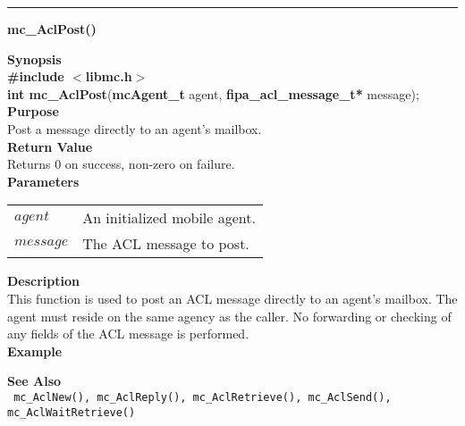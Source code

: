 \noindent
\vspace{5pt}
\rule{6.5in}{0.015in}
\noindent
{}
{\LARGE \bf mc\_AclPost()}\\
\label{api:mc_AclPost()}

\noindent
{\bf Synopsis}\\
{\bf \#include $<$libmc.h$>$}\\
{\bf int mc\_AclPost}({\bf mcAgent\_t} agent, {\bf fipa\_acl\_message\_t*} message);\\

\noindent
{\bf Purpose}\\
Post a message directly to an agent's mailbox.\\

\noindent
{\bf Return Value}\\
Returns 0 on success, non-zero on failure.\\

\noindent
{\bf Parameters}
\vspace{-0.1in}
\begin{description}
\item
\begin{tabular}{p{10 mm}p{145 mm}} 
$agent$ & An initialized mobile agent. \\
$message$ & The ACL message to post. 
\end{tabular}
\end{description}

\noindent
{\bf Description}\\
This function is used to post an ACL message directly to an agent's 
mailbox. The agent must reside on the same agency as the caller.
No forwarding or checking of any fields of the ACL message is performed.\\

\noindent
{\bf Example}\\
\noindent

\noindent
{\bf See Also}\\
\texttt{
  mc\_AclNew(), mc\_AclReply(), mc\_AclRetrieve(), mc\_AclSend(), 
    \linebreak mc\_AclWaitRetrieve()
}

